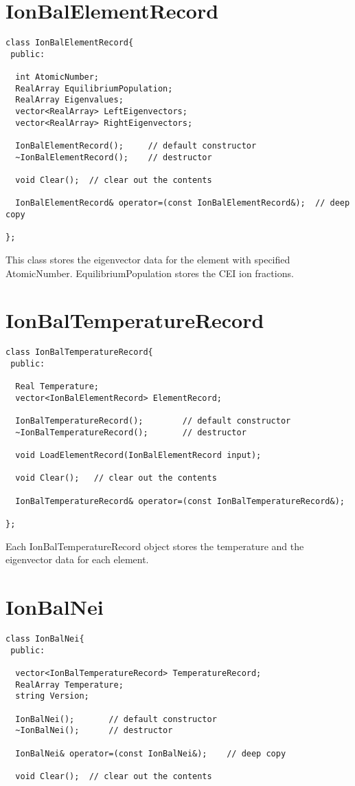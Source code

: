 \documentclass[11pt]{book}
\begin{document}
\section{IonBalElementRecord}

\begin{verbatim}
class IonBalElementRecord{
 public:

  int AtomicNumber;
  RealArray EquilibriumPopulation;
  RealArray Eigenvalues;
  vector<RealArray> LeftEigenvectors;
  vector<RealArray> RightEigenvectors;
  
  IonBalElementRecord();     // default constructor
  ~IonBalElementRecord();    // destructor

  void Clear();  // clear out the contents

  IonBalElementRecord& operator=(const IonBalElementRecord&);  // deep copy

};
\end{verbatim}

This class stores the eigenvector data for the element with specified
AtomicNumber. EquilibriumPopulation stores the CEI ion fractions.

\section{IonBalTemperatureRecord}

\begin{verbatim}
class IonBalTemperatureRecord{
 public:

  Real Temperature;
  vector<IonBalElementRecord> ElementRecord;

  IonBalTemperatureRecord();        // default constructor
  ~IonBalTemperatureRecord();       // destructor

  void LoadElementRecord(IonBalElementRecord input);

  void Clear();   // clear out the contents

  IonBalTemperatureRecord& operator=(const IonBalTemperatureRecord&);

};
\end{verbatim}

Each IonBalTemperatureRecord object stores the temperature and the
eigenvector data for each element.

\section{IonBalNei}

\begin{verbatim}
class IonBalNei{
 public:

  vector<IonBalTemperatureRecord> TemperatureRecord;
  RealArray Temperature;
  string Version;

  IonBalNei();       // default constructor
  ~IonBalNei();      // destructor

  IonBalNei& operator=(const IonBalNei&);    // deep copy

  void Clear();  // clear out the contents
\end{verbatim}
\end{document}
